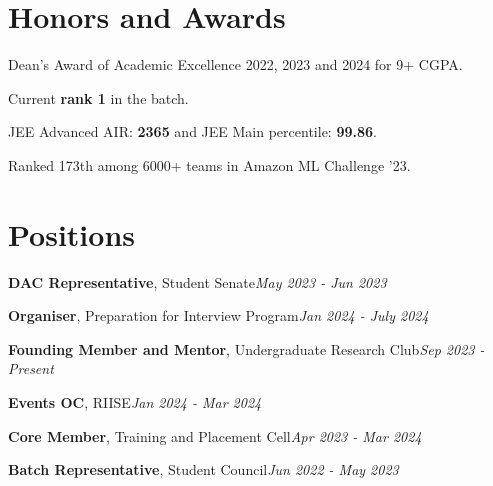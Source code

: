 \documentclass[a4paper,20pt]{article}
\begin{document}
\section{Honors and Awards}
\begin{description}[font=$\bullet$]
\item {Dean's Award of Academic Excellence 2022, 2023 and 2024 for 9+ CGPA.}
\vspace{-6pt}
\item {Current \textbf{rank 1} in the batch.}
\vspace{-6pt}
\item{JEE Advanced AIR: \textbf{2365} and JEE Main percentile: \textbf{99.86}.}
\vspace{-6pt}
\item{Ranked 173th among 6000+ teams in Amazon ML Challenge '23.}
\end{description}

\vspace{3pt}
\section{Positions}
\begin{description}[font=$\bullet$]
\item {\textbf{DAC Representative}, Student Senate}\hfill \textit{May 2023 - Jun 2023}
\vspace{-6pt}
\item {\textbf{Organiser}, Preparation for Interview Program}\hfill \textit{Jan 2024 - July 2024}
\vspace{-6pt}
\item {\textbf{Founding Member and Mentor}, Undergraduate Research Club}\hfill \textit{Sep 2023 - Present}
\vspace{-6pt}
\item {\textbf{Events OC}, RIISE}\hfill \textit{Jan 2024 - Mar 2024}
\vspace{-6pt}
\item {\textbf{Core Member}, Training and Placement Cell}\hfill \textit{Apr 2023 - Mar 2024}
\vspace{-6pt}
\item {\textbf{Batch Representative}, Student Council}\hfill \textit{Jun 2022 - May 2023}
\vspace{-6pt}
\end{description}
\end{document}

